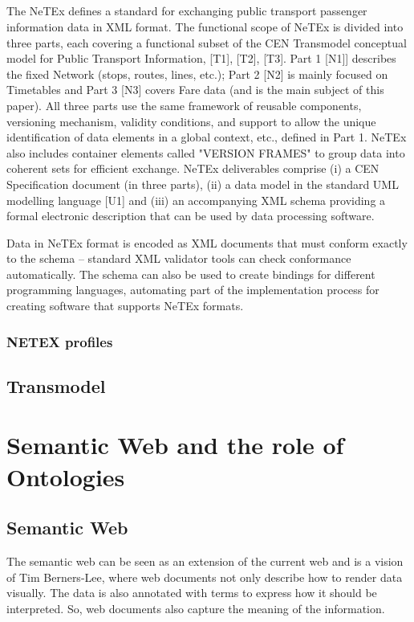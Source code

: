 \subsection{}
The NeTEx defines a standard for exchanging public transport passenger information data in XML format. The functional
scope of NeTEx is divided into three parts, each covering a functional subset of the CEN Transmodel conceptual
model for Public Transport Information, [T1], [T2], [T3].
Part 1 [N1]] describes the fixed Network (stops, routes, lines, etc.); Part 2 [N2] is mainly focused on Timetables and
Part 3 [N3] covers Fare data (and is the main subject of this paper). All three parts use the same framework of reusable
components, versioning mechanism, validity conditions, and support to allow the unique identification of data elements
in a global context, etc., defined in Part 1. NeTEx also includes container elements called "VERSION FRAMES"
to group data into coherent sets for efficient exchange.
NeTEx deliverables comprise (i) a CEN Specification document (in three parts), (ii) a data model in the standard UML
modelling language [U1] and (iii) an accompanying XML schema providing a formal electronic description that can
be used by data processing software.

Data in NeTEx format is encoded as XML documents that must conform exactly to the schema – standard XML validator tools can check conformance automatically. The schema can also be used to create bindings for different
programming languages, automating part of the implementation process for creating software that supports NeTEx
formats. 
\subsubsection{NETEX profiles}
\subsection{Transmodel}
\section{Semantic Web and the role of Ontologies}\label{section:ontologies_rel_work}
\subsection{Semantic Web}
The semantic web can be seen as an extension of the current web and is a vision of Tim Berners-Lee, where web documents not only describe how to render data visually. The data is also annotated with terms to express how it should be interpreted. So, web documents also capture the meaning of the information.

